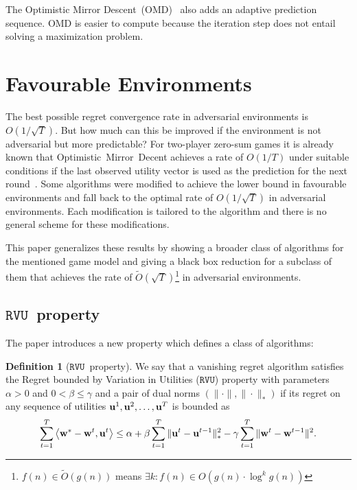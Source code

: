\documentclass[a4paper]{article}
\theoremstyle{definition}
\newtheorem{defn}[theorem]{Definition}
\newcommand{\myprop}{\ensuremath{\texttt{RVU}}}
\renewcommand{\vec}[1]{\ensuremath{{\bf #1}}}
\newcommand{\dotp}[2]{\ensuremath{\left\langle #1, #2 \right\rangle}}
\begin{document}
The Optimistic Mirror Descent~(OMD)~\cite[]{OMD} also adds an adaptive prediction sequence.
OMD is easier to compute because the iteration step does not entail
solving a maximization problem.





\section{Favourable Environments}
\label{sec:favo-envir}

The best possible regret convergence rate in adversarial environments is
$O(1/\sqrt{T})$.
But how much can this be improved if the environment is not
adversarial but more predictable?
For two-player zero-sum games it is already known that
Optimistic~Mirror~Decent achieves a rate of $O(1/T)$ under suitable
conditions if the last observed utility vector is used as the
prediction for the next round~\cite{2013arXiv1311.1869R}.
Some algorithms were modified to achieve
the lower bound in favourable environments and fall back to the
optimal rate of $O(1/\sqrt{T})$ in adversarial environments.
Each modification is tailored to the algorithm and there is no general scheme for these modifications.

This paper generalizes these results by
showing a broader class of algorithms for the mentioned game model
and giving a black box reduction for a subclass of them that achieves the rate of $\tilde{O}(\sqrt{T})$\footnote{$f(n)\in\tilde{O}(g(n))$ means $\exists
  k : f(n) \in O(g(n) \cdot \log^k g(n))$} in
adversarial environments.

\subsection{\myprop~property}
\label{sec:myprop}

\setcounter{theorem}{2}

The paper introduces a new property which defines a class of
algorithms:
\begin{defn}[\myprop~property]
  We say that a vanishing regret algorithm satisfies the Regret
  bounded by Variation in Utilities (\myprop) property with parameters
  $\alpha > 0$ and $0 < \beta \leq \gamma$ and a pair of dual norms
  $(\|\cdot\|, \|\cdot\|_*)$  if its regret on any sequence of utilities
  $\vec{u}^1, \vec{u}^2, \ldots, \vec{u}^T$ is bounded as
  \begin{equation*}
    \sum_{t=1}^{T} \dotp{\vec{w}^*- \vec{w}^t}{\vec{u}^t} \leq \alpha
    +\beta \sum_{t=1}^{T} \| \vec{u}^t - \vec{u}^{t-1}\|_*^2 -
    \gamma\sum_{t=1}^{T} \|\vec{w}^{t} - \vec{w}^{t-1}\|^2.
    \label{eqn:reg-form}
  \end{equation*}  
  \label{defn:alg-class}
\end{defn}
\end{document}
